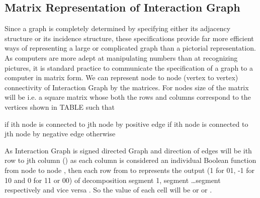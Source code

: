 \documentclass{article}
\begin{document}
\subsection{Matrix Representation of Interaction Graph}
\noindent
Since a graph is completely determined by specifying either its adjacency structure or its incidence structure, these specifications provide far more efficient ways of representing a large or complicated graph than a pictorial representation. As computers are more adept at manipulating numbers than at recognizing pictures, it is standard practice to communicate the specification of a graph to a computer in matrix form. We can represent node to node (vertex to vertex) connectivity of Interaction Graph by the matrices. For  nodes size of the matrix will be  i.e. a square matrix   whose both the  rows and  columns correspond to the  vertices shown in TABLE  such that \\
\begin{center}
 if ith node is connected to jth node by positive edge  if ith node is connected to jth node by negative edge  otherwise  
\end{center}
As Interaction Graph is signed directed Graph and direction of edges will be ith row to jth column () as each column is considered an individual Boolean function from node  to node , then each row from  to  represents the output (1 for 01, -1 for 10 and 0 for 11 or 00) of decomposition segment 1, segment  \ldots segment  respectively and vice versa . So the value of each cell will be  or  or .
\end{document}
